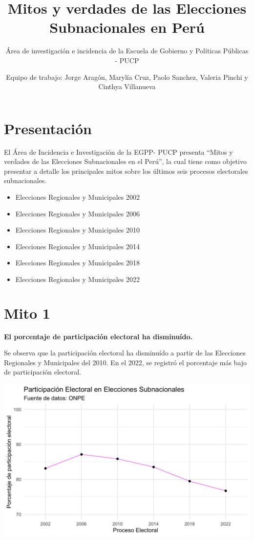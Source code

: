 \documentclass[
]{book}
\title{Mitos y verdades de las Elecciones Subnacionales en Perú}
\author{Área de investigación e incidencia de la Escuela de Gobierno y Políticas Públicas - PUCP}
\date{Equipo de trabajo: Jorge Aragón, Marylía Cruz, Paolo Sanchez, Valeria Pinchi y Cinthya Villanueva}
\theoremstyle{definition}
\theoremstyle{definition}
\theoremstyle{definition}
\theoremstyle{definition}
\theoremstyle{remark}
\begin{document}
\maketitle

{
\setcounter{tocdepth}{1}
\tableofcontents
}
\hypertarget{presentaciuxf3n}{%
\chapter{Presentación}\label{presentaciuxf3n}}

El Área de Incidencia e Investigación de la EGPP- PUCP presenta ``Mitos y verdades de las Elecciones Subnacionales en el Perú'', la cual tiene como objetivo presentar a detalle los principales mitos sobre los últimos seis procesos electorales subnacionales.

\begin{itemize}
\item
  Elecciones Regionales y Municipales 2002
\item
  Elecciones Regionales y Municipales 2006
\item
  Elecciones Regionales y Municipales 2010
\item
  Elecciones Regionales y Municipales 2014
\item
  Elecciones Regionales y Municipales 2018
\item
  Elecciones Regionales y Municipales 2022
\end{itemize}

\hypertarget{mito-1}{%
\chapter{Mito 1}\label{mito-1}}

\textbf{El porcentaje de participación electoral ha disminuído.}

Se observa que la participación electoral ha disminuído a partir de las Elecciones Regionales y Municipales del 2010. En el 2022, se registró el porcentaje más bajo de participación electoral.

\includegraphics[width=19.15in]{mito1_1}
\end{document}
